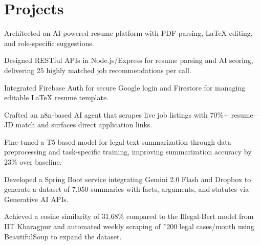 \documentclass[]{deedy-resume-reversed}
\begin{document}
            

\section{Projects}

            \hfill
            \begin{tightemize}
            \item Architected an AI-powered resume platform with PDF parsing, LaTeX editing, and role-specific suggestions.
\item Designed RESTful APIs in Node.js/Express for resume parsing and AI scoring, delivering 25 highly matched job recommendations per call.
\item Integrated Firebase Auth for secure Google login and Firestore for managing editable LaTeX resume template.
\item Crafted an n8n-based AI agent that scrapes live job listings with 70\%+ resume–JD match and surfaces direct application links.
            \end{tightemize}
            \sectionsep

            
            \hfill
            \begin{tightemize}
            \item Fine-tuned a T5-based model for legal-text summarization through data preprocessing and task-specific training, improving summarization accuracy by 23\% over baseline.
\item Developed a Spring Boot service integrating Gemini 2.0 Flash and Dropbox to generate a dataset of 7,050 summaries with facts, arguments, and statutes via Generative AI APIs.
\item Achieved a cosine similarity of 31.68\% compared to the Illegal-Bert model from IIT Kharagpur and automated weekly scraping of ˜200 legal cases/month using BeautifulSoup to expand the dataset.
            \end{tightemize}
            \sectionsep

            
\end{document}

